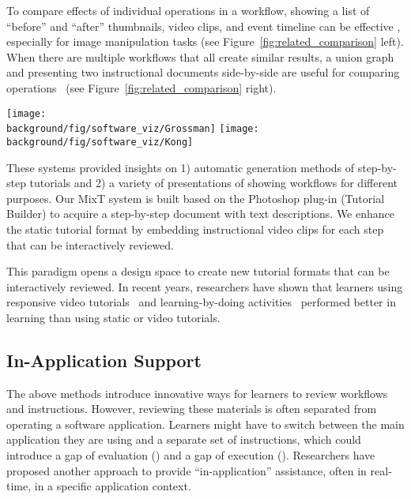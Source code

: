 To compare effects of individual operations in a workflow, showing a list of ``before'' and ``after'' thumbnails, video clips, and event timeline can be effective \cite{Grossman:2010jz}, especially for image manipulation tasks (see Figure~\ref{fig:related_comparison} left).
%
When there are multiple workflows that all create similar results, a union graph and presenting two instructional documents side-by-side are useful for comparing operations~\cite{Kong:2012:DTR:2207676.2208549} (see Figure~\ref{fig:related_comparison} right).

\begin{figure*}[t!]
  \centering
  \texttt{[image: \\background/fig/software\_viz/Grossman]}
  \texttt{[image: \\background/fig/software\_viz/Kong]}
  \caption{Instructional systems that help learners compare effects and similar tutorials using: (left) before and after images (a) and event timeline (b) by Grossman \ea{}~\cite{Grossman:2010jz} and (right) operation union graph by Kong \ea{}~\cite{Kong:2012:DTR:2207676.2208549}.}
  \label{fig:related_comparison}
\end{figure*}

These systems provided insights on 1) automatic generation methods of step-by-step tutorials and 2) a variety of presentations of showing workflows for different purposes. Our MixT system is built based on the Photoshop plug-in (Tutorial Builder) to acquire a step-by-step document with text descriptions. We enhance the static tutorial format by embedding instructional video clips for each step that can be interactively reviewed.

This paradigm opens a design space to create new tutorial formats that can be interactively reviewed. In recent years, researchers have shown that learners using responsive video tutorials~\cite{Nguyen:2015:MST:2702123.2702209} and learning-by-doing activities~\cite{Kwon:2016:CEO:2858036.2858101} performed better in learning than using static or video tutorials.


\subsection{In-Application Support}

The above methods introduce innovative ways for learners to review workflows and instructions. However, reviewing these materials is often separated from operating a software application. Learners might have to switch between the main application they are using and a separate set of instructions, which could introduce a gap of evaluation () and a gap of execution ().
%
Researchers have proposed another approach to provide ``in-application'' assistance, often in real-time, in a specific application context.

